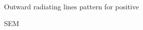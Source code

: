  \begin{figure}[!t]	
     \centering
     \begin{subfigure}[t]{0.24\linewidth}
  	\centering
  	\caption{Outward radiating lines pattern for positive }
  	\label{fig:b2d1_q1}
  \end{subfigure}
 \hfill
     \begin{subfigure}[t]{0.24\linewidth}
  	\centering
  	\caption{SEM}
  	\label{fig:b2d2_q2}
  \end{subfigure}
 \hfill
     \begin{subfigure}[t]{0.24\linewidth}

\end{subfigure}
\end{figure}

